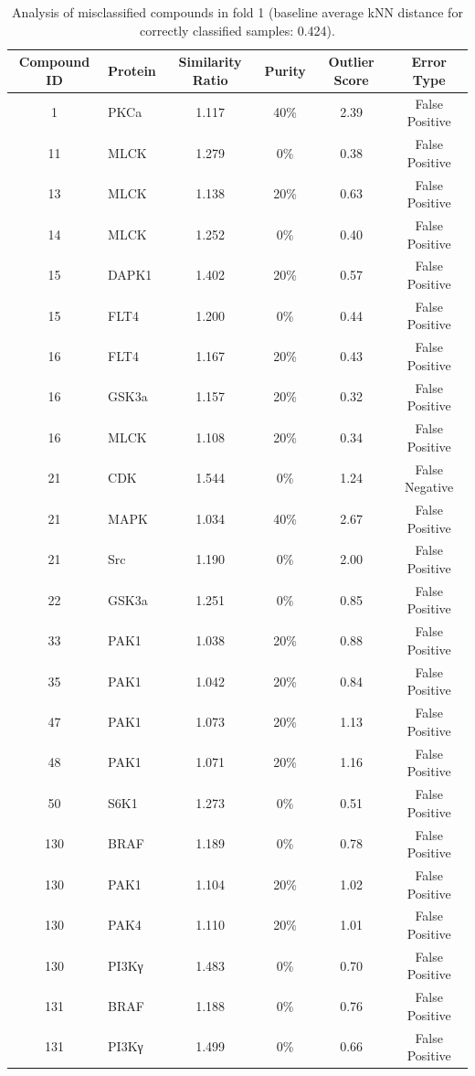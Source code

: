 \documentclass{article}
\newenvironment{smarttabular}[1]{%
    \begin{tabular}{#1}%
}{%
    \end{tabular}%
}
\begin{document}
\begin{table}[H]
    \centering
    \small
    \caption{Analysis of misclassified compounds in fold 1 (baseline average kNN distance for correctly classified samples: 0.424).}
    \label{tab:misclassified_compounds_1}
    \begin{smarttabular}{clcccc}
        \toprule
        \textbf{Compound ID} & \textbf{Protein} & \textbf{Similarity Ratio} & \textbf{Purity} & \textbf{Outlier Score} & \textbf{Error Type} \\
        \midrule
        1 & PKCa & 1.117 & 40\% & 2.39 & False Positive \\
        11 & MLCK & 1.279 & 0\% & 0.38 & False Positive \\
        13 & MLCK & 1.138 & 20\% & 0.63 & False Positive \\
        14 & MLCK & 1.252 & 0\% & 0.40 & False Positive \\
        15 & DAPK1 & 1.402 & 20\% & 0.57 & False Positive \\
        15 & FLT4 & 1.200 & 0\% & 0.44 & False Positive \\
        16 & FLT4 & 1.167 & 20\% & 0.43 & False Positive \\
        16 & GSK3a & 1.157 & 20\% & 0.32 & False Positive \\
        16 & MLCK & 1.108 & 20\% & 0.34 & False Positive \\
        21 & CDK & 1.544 & 0\% & 1.24 & False Negative \\
        21 & MAPK & 1.034 & 40\% & 2.67 & False Positive \\
        21 & Src & 1.190 & 0\% & 2.00 & False Positive \\
        22 & GSK3a & 1.251 & 0\% & 0.85 & False Positive \\
        33 & PAK1 & 1.038 & 20\% & 0.88 & False Positive \\
        35 & PAK1 & 1.042 & 20\% & 0.84 & False Positive \\
        47 & PAK1 & 1.073 & 20\% & 1.13 & False Positive \\
        48 & PAK1 & 1.071 & 20\% & 1.16 & False Positive \\
        50 & S6K1 & 1.273 & 0\% & 0.51 & False Positive \\
        130 & BRAF & 1.189 & 0\% & 0.78 & False Positive \\
        130 & PAK1 & 1.104 & 20\% & 1.02 & False Positive \\
        130 & PAK4 & 1.110 & 20\% & 1.01 & False Positive \\
        130 & PI3Kγ & 1.483 & 0\% & 0.70 & False Positive \\
        131 & BRAF & 1.188 & 0\% & 0.76 & False Positive \\
        131 & PI3Kγ & 1.499 & 0\% & 0.66 & False Positive \\
        \bottomrule
    \end{smarttabular}
\end{table}
\end{document}
